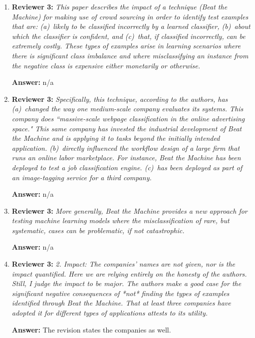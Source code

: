 \documentclass[letterpaper]{article}
\begin{document}
\begin{enumerate}


\item \textbf{Reviewer 3:} \emph{ This paper describes the impact of a technique (Beat the Machine) for making use of crowd sourcing in order to identify test examples that are: (a)~likely to be classified incorrectly by a learned classifier, (b)~about which the classifier is confident, and (c)~that, if classified incorrectly, can be extremely costly. These types of examples arise in learning scenarios where there is significant class imbalance and where misclassifying an instance from the negative class is expensive either monetarily or otherwise.}

\textbf{Answer:} n/a

\item \textbf{Reviewer 3:} \emph{ Specifically, this technique, according to the authors, has (a)~changed the way one medium-scale company evaluates its systems.  This company does ``massive-scale webpage classification in the online advertising space."  This same company has invested the industrial development of Beat the Machine and is applying it to tasks beyond the initially intended application. (b)~directly influenced the workflow design of a large firm that runs an online labor marketplace.  For instance, Beat the Machine has been deployed to test a job classification engine. (c)~has been deployed as part of an image-tagging service for a third company.}

\textbf{Answer:} n/a

\item \textbf{Reviewer 3:} \emph{ More generally, Beat the Machine provides a new approach for testing machine learning models where the misclassification of rare, but systematic, cases can be problematic, if not catastrophic.}

\textbf{Answer:} n/a

\item \textbf{Reviewer 3:} \emph{ 2. Impact: The companies' names are not given, nor is the impact quantified.  Here we are relying entirely on the honesty of the authors.  Still, I judge the impact to be major.  The authors make a good case for the significant negative consequences of *not* finding the types of examples identified through Beat the Machine.  That at least three companies have adopted it for different types of applications attests to its utility.}

\textbf{Answer:} The revision states the companies as well.


\end{enumerate}
\end{document}
